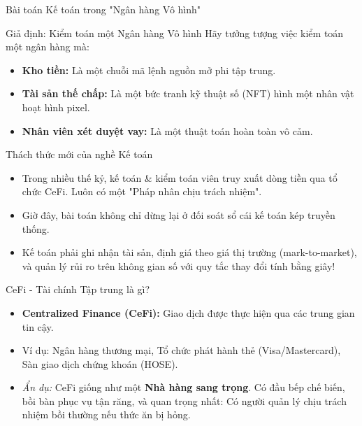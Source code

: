 \documentclass[aspectratio=169, 12pt]{beamer}
\begin{document}
\begin{frame}{Bài toán Kế toán trong "Ngân hàng Vô hình"}
    \begin{block}{Giả định: Kiểm toán một Ngân hàng Vô hình}
        Hãy tưởng tượng việc kiểm toán một ngân hàng mà:
        \begin{itemize}
            \item \textbf{Kho tiền:} Là một chuỗi mã lệnh nguồn mở phi tập trung.
            \item \textbf{Tài sản thế chấp:} Là một bức tranh kỹ thuật số (NFT) hình một nhân vật hoạt hình pixel.
            \item \textbf{Nhân viên xét duyệt vay:} Là một thuật toán hoàn toàn vô cảm.
        \end{itemize}
    \end{block}
\end{frame}

\begin{frame}{Thách thức mới của nghề Kế toán}
    \begin{itemize}
        \item Trong nhiều thế kỷ, kế toán \& kiểm toán viên truy xuất dòng tiền qua tổ chức CeFi. Luôn có một "Pháp nhân chịu trách nhiệm".
        \item Giờ đây, bài toán không chỉ dừng lại ở đối soát sổ cái kế toán kép truyền thống.
        \item Kế toán phải ghi nhận tài sản, định giá theo giá thị trường (mark-to-market), và quản lý rủi ro trên không gian số với quy tắc thay đổi tính bằng giây!
    \end{itemize}
\end{frame}

\begin{frame}{CeFi - Tài chính Tập trung là gì?}
    \begin{itemize}
        \item \textbf{Centralized Finance (CeFi):} Giao dịch được thực hiện qua các trung gian tin cậy.
        \item Ví dụ: Ngân hàng thương mại, Tổ chức phát hành thẻ (Visa/Mastercard), Sàn giao dịch chứng khoán (HOSE).
        \item \textit{Ẩn dụ:} CeFi giống như một \textbf{Nhà hàng sang trọng}. Có đầu bếp chế biến, bồi bàn phục vụ tận răng, và quan trọng nhất: Có người quản lý chịu trách nhiệm bồi thường nếu thức ăn bị hỏng.
    \end{itemize}
\end{frame}
\end{document}
